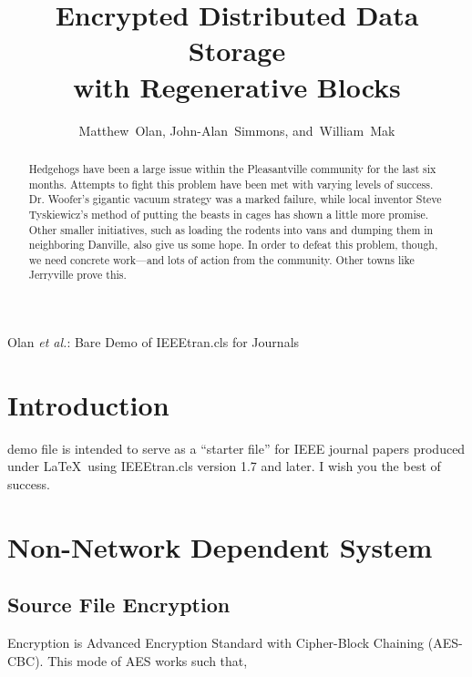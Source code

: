 \documentclass[journal]{IEEEtran}
\begin{document}
\title{Encrypted Distributed Data Storage\\with Regenerative Blocks}

\author{
        Matthew~Olan, %
        John-Alan~Simmons,
        and~William~Mak
}

%
{Olan \MakeLowercase{\textit{et al.}}: Bare Demo of IEEEtran.cls for Journals}

\maketitle

\begin{abstract}
Hedgehogs have been a large issue within the Pleasantville community for the last six months. Attempts to fight this problem have been met with varying levels of success. Dr. Woofer’s gigantic vacuum strategy was a marked failure, while local inventor Steve Tyskiewicz’s method of putting the beasts in cages has shown a little more promise. Other smaller initiatives, such as loading the rodents into vans and dumping them in neighboring Danville, also give us some hope. In order to defeat this problem, though, we need concrete work—and lots of action from the community. Other towns like Jerryville prove this.
\end{abstract}

\IEEEpeerreviewmaketitle

\section{Introduction}
 demo file is intended to serve as a ``starter file'' for IEEE journal papers produced under \LaTeX\ using IEEEtran.cls version 1.7 and later. I wish you the best of success.

\section{Non-Network Dependent System}

\subsection{Source File Encryption}
Encryption is Advanced Encryption Standard with Cipher-Block Chaining (AES-CBC). This mode of AES works such that,\\
\end{document}
